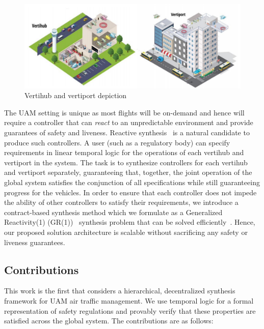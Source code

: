 \begin{figure}
	\centering
	\includegraphics[width=0.98\columnwidth]{UAM-NFM/Figures/vert.PNG}
	\caption{Vertihub and vertiport depiction}
	\label{fig:uam_architecture}
\end{figure}


The UAM setting is unique as most flights will be on-demand and hence will require a controller that can \emph{react} to an unpredictable environment and provide guarantees of safety and liveness. Reactive synthesis~\cite{bloem2018graph} is a natural candidate to produce such controllers. A user (such as a regulatory body) can specify requirements in linear temporal logic for the operations of each vertihub and vertiport in the system. The task is to synthesize controllers for each vertihub and vertiport separately, guaranteeing that, together, the joint operation of the global system satisfies the conjunction of all specifications while still guaranteeing progress for the vehicles. In order to ensure that each controller does not impede the ability of other controllers to satisfy their requirements, we introduce a contract-based synthesis method which we formulate as a Generalized Reactivity(1) (GR(1))~\cite{bloem2012} synthesis problem that can be solved efficiently~\cite{wolff2013efficient,alur2016compositional}. Hence, our proposed solution architecture is scalable without sacrificing any safety or liveness guarantees. 


\subsection{Contributions}
This work is the first that considers a hierarchical, decentralized synthesis framework for UAM air traffic management. We use temporal logic for a formal representation of safety regulations and provably verify that these properties are satisfied across the global system. The contributions are as follows:

